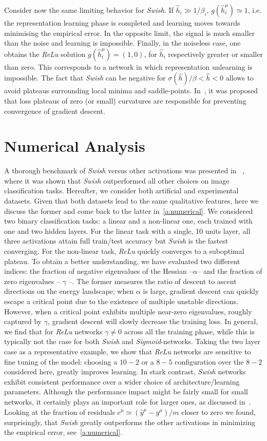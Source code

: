 \documentclass{article}
\begin{document}
Consider now the same limiting behavior for {\it Swish}. If $\hat{h}_i \gg 1/\beta_i$, $g(\hat{h}^{\mu}_i)\simeq 1$, i.e. the representation learning phase is completed and learning moves towards minimising the empirical error. In the opposite limit, the signal is much smaller than the noise and learning is impossible. Finally, in the noiseless case, one obtains the {\it ReLu} solution $g(\hat{h}^{\mu}_i) = (1, 0) $, for $\hat{h}_i $ respectively greater or smaller than zero. This corresponds to a network in which representation unlearning is impossible. The fact that {\it Swish} can be negative for $\sigma(\hat{h})/\beta <\hat{h}<0$ allows to avoid plateaus surrounding local minima and saddle-points. In~\cite{dauphin}, it was proposed that loss plateaus of zero (or small) curvatures are responsible for preventing convergence of gradient descent.
\section{Numerical Analysis}\label{sec:numerical}
%
A thorough benchmark of {\it Swish} versus other activations was presented in ~\cite{prajit}, where it was shown that {\it Swish} outperformed all other choices on image classification tasks. Hereafter,  we consider both artificial and experimental datasets. Given that both datasets lead to the same qualitative features, here we discuss the former and come back to the latter in~\eqref{a:numerical}. We considered two binary classification tasks: a linear and a non-linear one, each trained with one and two hidden layers. For the linear task with a single, 10 units layer, all three activations attain full train/test accuracy but {\it Swish} is the fastest converging.  For the non-linear task, {\it ReLu} quickly converges to a suboptimal plateau. To obtain a better understanding, we have evaluated two different indices: the fraction of negative eigenvalues of the Hessian --$\alpha$-- and the fraction of zero eigenvalues -- $\gamma$ --. The former measures the ratio of descent to ascent directions on the energy landscape; when $\alpha$ is large, gradient descent can quickly escape a critical point due to the existence of multiple unstable directions. However, when a critical point exhibits multiple near-zero eigenvalues, roughly captured by $\gamma$, gradient descent will slowly decrease the training loss.
In general, we find that for {\it ReLu} networks $\gamma \neq 0$ across all the training phase, while this is typically not the case for both {\it Swish} and {\it Sigmoid}-networks. Taking the two layer case as a representative example, we show that {\it ReLu} networks are sensitive to fine tuning of the model: choosing a $10-2$ or a $8-5$ configuration over the $8-2$ considered here, greatly improves learning. In stark contrast, {\it Swish} networks exhibit consistent performance over a wider choice of architecture/learning parameters. Although the performance impact might be fairly small for small networks, it certainly plays an important role for larger ones, as discussed in~\cite{prajit}. Looking at the fraction of residuals $e^{\mu} \simeq (\hat{y}^{\mu} - y^{\mu})/m$ closer to zero we found, surprisingly, that {\it Swish} greatly outperforms the other activations in minimizing the empirical error, see~\eqref{a:numerical}.
\end{document}
